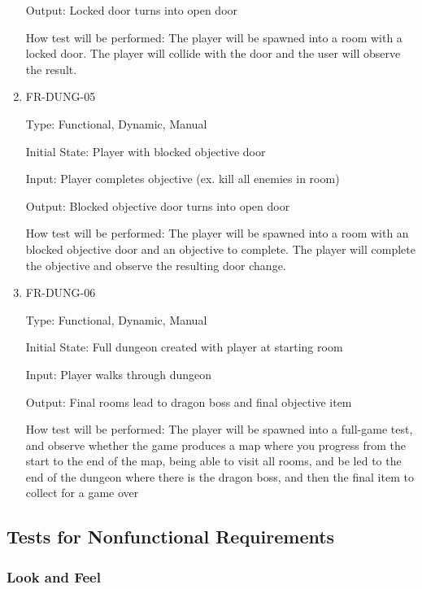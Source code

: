 \documentclass[12pt, titlepage]{article}
\begin{document}
\begin{enumerate}
Output: Locked door turns into open door

How test will be performed: The player will be spawned into a room with a locked door. The player will collide with the door and the user will observe the result.

\item{FR-DUNG-05\\}

Type: Functional, Dynamic, Manual

Initial State: Player with blocked objective door

Input: Player completes objective (ex. kill all enemies in room)

Output: Blocked objective door turns into open door

How test will be performed: The player will be spawned into a room with an blocked objective door and an objective to complete. The player will complete the objective and observe the resulting door change.

\item{FR-DUNG-06\\}

Type: Functional, Dynamic, Manual

Initial State: Full dungeon created with player at starting room

Input: Player walks through dungeon

Output: Final rooms lead to dragon boss and final objective item

How test will be performed: The player will be spawned into a full-game test, and observe whether the game produces a map where you progress from the start to the end of the map, being able to visit all rooms, and be led to the end of the dungeon where there is the dragon boss, and then the final item to collect for a game over
	
	
\end{enumerate}

\subsection{Tests for Nonfunctional Requirements}

\subsubsection{Look and Feel}
\end{document}
